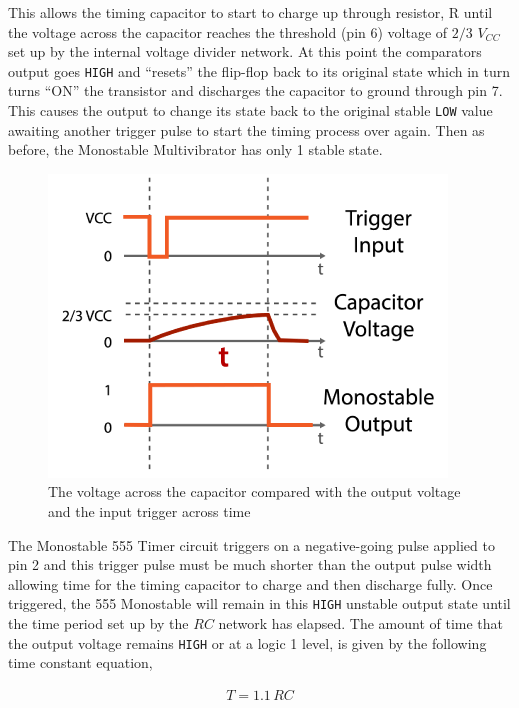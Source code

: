 This allows the timing capacitor to start to charge up through resistor, R until the voltage across the capacitor reaches the threshold (pin 6) voltage of $2/3$ $V_{CC}$ set up by the internal voltage divider network. At this point the comparators output goes \verb|HIGH| and “resets” the flip-flop back to its original state which in turn turns “ON” the transistor and discharges the capacitor to ground through pin 7. This causes the output to change its state back to the original stable \verb|LOW| value awaiting another trigger pulse to start the timing process over again. Then as before, the Monostable Multivibrator has only 1 stable state.

\begin{figure}[H]
    \centering
    \includegraphics[width=0.6\columnwidth]{images/mono1.png}
    \caption{The voltage across the capacitor compared with the output voltage and the input trigger across time}
    \label{mono1}
\end{figure}

The Monostable 555 Timer circuit triggers on a negative-going pulse applied to pin 2 and this trigger pulse must be much shorter than the output pulse width allowing time for the timing capacitor to charge and then discharge fully. Once triggered, the 555 Monostable will remain in this \verb|HIGH| unstable output state until the time period set up by the $R C$ network has elapsed. The amount of time that the output voltage remains \verb|HIGH| or at a logic 1 level, is given by the following time constant equation,

\begin{align}
    T=1.1\,RC
\end{align}

